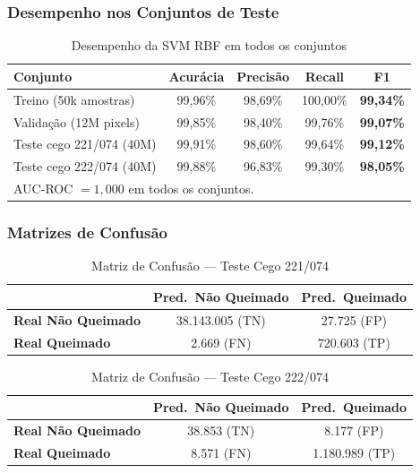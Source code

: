 \documentclass[conference]{IEEEtran}
\begin{document}
\subsubsection{Desempenho nos Conjuntos de Teste}

\begin{table}[!t]
  \caption{Desempenho da SVM RBF em todos os conjuntos}
  \label{tab:svm_rbf_results}
  \centering
  \setlength{\tabcolsep}{4pt}
  \begin{tabular}{lcccc}
    \toprule
    \textbf{Conjunto} & \textbf{Acurácia} & \textbf{Precisão}
                      & \textbf{Recall} & \textbf{F1} \\
    \midrule
    Treino (50k amostras)     & 99,96\% & 98,69\% & 100,00\% & \textbf{99,34\%} \\
    Validação (12M pixels)    & 99,85\% & 98,40\% &  99,76\% & \textbf{99,07\%} \\
    Teste cego 221/074 (40M)  & 99,91\% & 98,60\% &  99,64\% & \textbf{99,12\%} \\
    Teste cego 222/074 (40M)  & 99,88\% & 96,83\% &  99,30\% & \textbf{98,05\%} \\
    \bottomrule
    \multicolumn{5}{l}{AUC-ROC $= 1{,}000$ em todos os conjuntos.}
  \end{tabular}
\end{table}

\subsubsection{Matrizes de Confusão}

\begin{table}[!t]
  \caption{Matriz de Confusão — Teste Cego 221/074}
  \label{tab:svm_rbf_cm221}
  \centering
  \begin{tabular}{lcc}
    \toprule
    & \textbf{Pred.\ Não Queimado} & \textbf{Pred.\ Queimado} \\
    \midrule
    \textbf{Real Não Queimado} & 38.143.005 (TN) & 27.725 (FP) \\
    \textbf{Real Queimado}     &      2.669 (FN) & 720.603 (TP) \\
    \bottomrule
  \end{tabular}
\end{table}

\begin{table}[!t]
  \caption{Matriz de Confusão — Teste Cego 222/074}
  \label{tab:svm_rbf_cm222}
  \centering
  \begin{tabular}{lcc}
    \toprule
    & \textbf{Pred.\ Não Queimado} & \textbf{Pred.\ Queimado} \\
    \midrule
    \textbf{Real Não Queimado} & 38.853 (TN)     & 8.177 (FP)      \\
    \textbf{Real Queimado}     &  8.571 (FN)     & 1.180.989 (TP)  \\
    \bottomrule
  \end{tabular}
\end{table}
\end{document}
